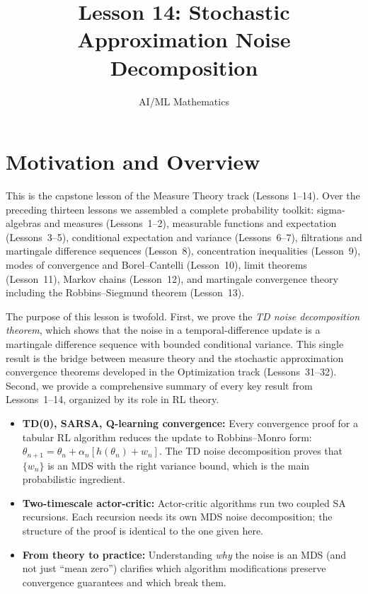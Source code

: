 \documentclass[11pt,a4paper]{article}
\title{Lesson 14: Stochastic Approximation Noise Decomposition}
\author{AI/ML Mathematics}
\date{}
\begin{document}
\maketitle
\tableofcontents
\newpage


\section{Motivation and Overview}
\label{sec:motivation}

This is the capstone lesson of the Measure Theory track (Lessons
1--14).  Over the preceding thirteen lessons we assembled a complete
probability toolkit: sigma-algebras and measures (Lessons~1--2),
measurable functions and expectation (Lessons~3--5), conditional
expectation and variance (Lessons~6--7), filtrations and
martingale difference sequences (Lesson~8), concentration
inequalities (Lesson~9), modes of convergence and
Borel--Cantelli (Lesson~10), limit theorems (Lesson~11), Markov
chains (Lesson~12), and martingale convergence theory including
the Robbins--Siegmund theorem (Lesson~13).

The purpose of this lesson is twofold.  First, we prove the
\emph{TD noise decomposition theorem}, which shows that the noise
in a temporal-difference update is a martingale difference sequence
with bounded conditional variance.  This single result is the
bridge between measure theory and the stochastic approximation
convergence theorems developed in the Optimization track
(Lessons~31--32).  Second, we provide a comprehensive summary of
every key result from Lessons~1--14, organized by its role in RL
theory.

\begin{rlconnection}[title={Why This Matters for RL}]
\begin{itemize}[nosep]
  \item \textbf{TD(0), SARSA, Q-learning convergence:}
    Every convergence proof for a tabular RL algorithm
    reduces the update to Robbins--Monro form:
    $\theta_{n+1} = \theta_n + \alpha_n [h(\theta_n) + w_n]$.
    The TD noise decomposition proves that $\{w_n\}$ is an MDS
    with the right variance bound, which is the main
    probabilistic ingredient.
  \item \textbf{Two-timescale actor-critic:}
    Actor-critic algorithms run two coupled SA recursions.
    Each recursion needs its own MDS noise decomposition; the
    structure of the proof is identical to the one given here.
  \item \textbf{From theory to practice:}
    Understanding \emph{why} the noise is an MDS (and not
    just ``mean zero'') clarifies which algorithm modifications
    preserve convergence guarantees and which break them.
\end{itemize}
\end{rlconnection}
\end{document}
